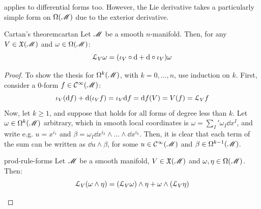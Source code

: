  applies to differential forms too. However, the Lie derivative takes a particularly simple form on $ \Omega(\mathscr{M}) $ due to the exterior derivative.

\begin{theorem}{Cartan's theorem}{cartan}
  Let $ \mathscr{M} $ be a smooth $ n $-manifold. Then, for any $ V \in \mathfrak{X}(\mathscr{M}) $ and $ \omega \in \Omega(\mathscr{M}) $:
  \begin{equation}
    \EuScript{L}_V \omega = (\iota_V \circ \mathrm{d} + \mathrm{d} \circ \iota_V) \omega
    \label{eq:cartan-formula}
  \end{equation}
\end{theorem}

\begin{proofbox}
  \begin{proof}
    To show the thesis for $ \Omega^{k}(\mathscr{M}) $, with $ k = 0 , \dots , n $, use induction on $ k $. First, consider a $ 0 $-form $ f \in \mathcal{C}^{\infty}(\mathscr{M}) $:
    \begin{equation*}
      \iota_V (\mathrm{d} f) + \mathrm{d} (\iota_V f) = \iota_V \mathrm{d} f = \mathrm{d} f(V) = V(f) = \EuScript{L}_V f
    \end{equation*}
    Now, let $ k \geq 1 $, and suppose that  holds for all forms of degree less than $ k $. Let $ \omega \in \Omega^{k}(\mathscr{M}) $ arbitrary, which in smooth local coordinates is $ \omega = {\sum_I}' \omega_I \dd x^I $, and write e.g. $ u = x^{i_1} $ and $ \beta = \omega_I \dd x^{i_2} \wedge \dots \wedge \dd x^{i_k} $. Then, it is clear that each term of the sum can be written as $ \dd u \wedge \beta $, for some $ u \in \mathcal{C}^{\infty}(\mathscr{M}) $ and $ \beta \in \Omega^{k-1}(\mathscr{M}) $.

    \begin{lemma}{}{prod-rule-forms}
      Let $ \mathscr{M} $ be a smooth manifold, $ V \in \mathfrak{X}(\mathscr{M}) $ and $ \omega , \eta \in \Omega(\mathscr{M}) $. Then:
      \begin{equation}
        \EuScript{L}_V (\omega \wedge \eta) = (\EuScript{L}_V \omega) \wedge \eta + \omega \wedge (\EuScript{L}_V \eta)
      \end{equation}
    \end{lemma}


\end{proof}
\end{proofbox}
